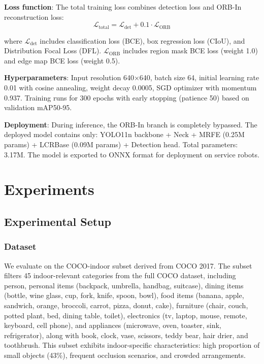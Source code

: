 \documentclass[journal]{IEEEtran}
\begin{document}
\textbf{Loss function}: The total training loss combines detection loss and ORB-In reconstruction loss:
\begin{equation}
\mathcal{L}_{\text{total}} = \mathcal{L}_{\text{det}} + 0.1 \cdot \mathcal{L}_{\text{ORB}}
\end{equation}

where $\mathcal{L}_{\text{det}}$ includes classification loss (BCE), box regression loss (CIoU), and Distribution Focal Loss (DFL). $\mathcal{L}_{\text{ORB}}$ includes region mask BCE loss (weight 1.0) and edge map BCE loss (weight 0.5).

\textbf{Hyperparameters}: Input resolution 640×640, batch size 64, initial learning rate 0.01 with cosine annealing, weight decay 0.0005, SGD optimizer with momentum 0.937. Training runs for 300 epochs with early stopping (patience 50) based on validation mAP50-95.

\textbf{Deployment}: During inference, the ORB-In branch is completely bypassed. The deployed model contains only: YOLO11n backbone + Neck + MRFE (0.25M params) + LCRBase (0.09M params) + Detection head. Total parameters: 3.17M. The model is exported to ONNX format for deployment on service robots.

\section{Experiments}
\label{sec:experiments}

\subsection{Experimental Setup}

\subsubsection{Dataset}

We evaluate on the COCO-indoor subset derived from COCO 2017. The subset filters 45 indoor-relevant categories from the full COCO dataset, including person, personal items (backpack, umbrella, handbag, suitcase), dining items (bottle, wine glass, cup, fork, knife, spoon, bowl), food items (banana, apple, sandwich, orange, broccoli, carrot, pizza, donut, cake), furniture (chair, couch, potted plant, bed, dining table, toilet), electronics (tv, laptop, mouse, remote, keyboard, cell phone), and appliances (microwave, oven, toaster, sink, refrigerator), along with book, clock, vase, scissors, teddy bear, hair drier, and toothbrush. This subset exhibits indoor-specific characteristics: high proportion of small objects (43\%), frequent occlusion scenarios, and crowded arrangements.
\end{document}
